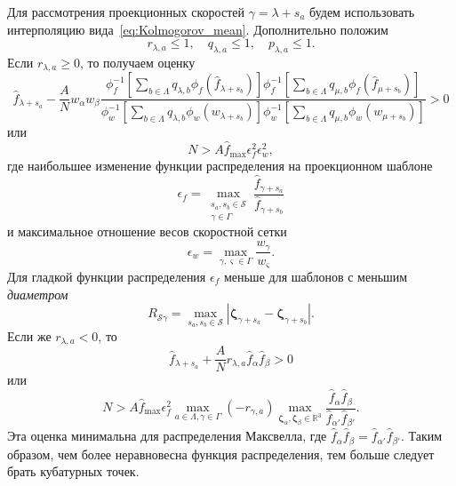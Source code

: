 \documentclass[a4paper,12pt]{article}
\newcommand{\bzeta}{\boldsymbol{\zeta}}
\begin{document}
Для рассмотрения проекционных скоростей \(\gamma = \lambda+s_a\)
будем использовать интерполяцию вида~\eqref{eq:Kolmogorov_mean}.
Дополнительно положим
\begin{equation}\label{eq:normal_stencil}
    r_{\lambda,a} \leq 1, \quad q_{\lambda,a} \leq 1, \quad p_{\lambda,a} \leq 1.
\end{equation}
Если \(r_{\lambda,a} \geq 0\), то получаем оценку
\begin{equation}\label{eq:positive_f_lambda+}
    \hat{f}_{\lambda+s_a} - \frac{A}{N} w_\alpha w_\beta
    \frac{
        \phi_f^{-1}\left[\sum_{b\in\Lambda} q_{\lambda,b} \phi_f\left(\hat{f}_{\lambda+s_b}\right)\right]
        \phi_f^{-1}\left[\sum_{b\in\Lambda} q_{\mu,b} \phi_f\left(\hat{f}_{\mu+s_b}\right)\right]
    }{
        \phi_w^{-1}\left[\sum_{b\in\Lambda} q_{\lambda,b} \phi_w\left(w_{\lambda+s_b}\right)\right]
        \phi_w^{-1}\left[\sum_{b\in\Lambda} q_{\mu,b} \phi_w\left(w_{\mu+s_b}\right)\right]
    }> 0
\end{equation}
или
\begin{equation}\label{eq:positive_f_lambda2+}
    N > A \hat{f}_{\max} \epsilon_f^2 \epsilon_w^2,
\end{equation}
где наибольшее изменение функции распределения на проекционном шаблоне
\begin{equation}\label{eq:epsilon_f}
    \epsilon_f = \max_{\substack{s_a,s_b\in\mathcal{S}\\\gamma\in\Gamma}} \frac{\hat{f}_{\gamma+s_a}}{\hat{f}_{\gamma+s_b}}
\end{equation}
и максимальное отношение весов скоростной сетки
\begin{equation}\label{eq:epsilon_w}
    \epsilon_w = \max_{\gamma,\varsigma\in\Gamma} \frac{w_\gamma}{w_\varsigma}.
\end{equation}
Для гладкой функции распределения \(\epsilon_f\) меньше для шаблонов с меньшим \emph{диаметром}
\begin{equation}\label{eq:stencil_diameter}
    R_{\mathcal{S}\gamma} = \max_{s_a,s_b\in\mathcal{S}}
        \left| \bzeta_{\gamma+s_a} - \bzeta_{\gamma+s_b} \right|.
\end{equation}
Если же \(r_{\lambda,a} < 0\), то
\begin{equation}\label{eq:positive_f_lambda-}
    \hat{f}_{\lambda+s_a} + \frac{A}{N}r_{\lambda,a} \hat{f}_{\alpha}\hat{f}_{\beta} > 0
\end{equation}
или
\begin{equation}\label{eq:positive_f_lambda2-}
    N > A \hat{f}_{\max} \epsilon_f^2
        \max_{a\in\Lambda,\gamma\in\Gamma}\left(-r_{\gamma,a}\right)
        \max_{\bzeta_\alpha,\bzeta_\beta\in\mathbb{R}^3}
        \frac{\hat{f}_{\alpha}\hat{f}_{\beta}}{\hat{f}_{\alpha'}\hat{f}_{\beta'}}.
\end{equation}
Эта оценка минимальна для распределения Максвелла,
где \(\hat{f}_{\alpha}\hat{f}_{\beta} = \hat{f}_{\alpha'}\hat{f}_{\beta'}\).
Таким образом, чем более неравновесна функция распределения,
тем больше следует брать кубатурных точек.
\end{document}
